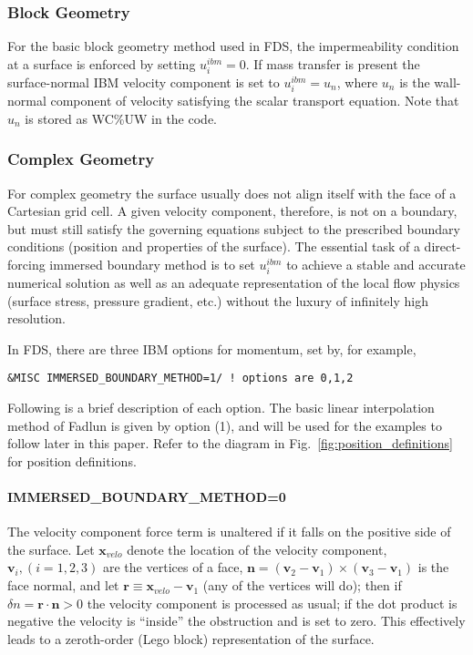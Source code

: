 \documentclass[12pt]{article}
\begin{document}
\subsubsection{Block Geometry}

For the basic block geometry method used in FDS, the impermeability condition at a surface is enforced by setting $u_i^{ibm} = 0$. If mass transfer is present the surface-normal IBM velocity component is set to $u_i^{ibm} = u_n$, where $u_n$ is the wall-normal component of velocity satisfying the scalar transport equation.  Note that $u_n$ is stored as {\ct WC\%UW} in the code.

\subsubsection{Complex Geometry}

For complex geometry the surface usually does not align itself with the face of a Cartesian grid cell. A given velocity component, therefore, is not on a boundary, but must still satisfy the governing equations subject to the prescribed boundary conditions (position and properties of the surface).  The essential task of a direct-forcing immersed boundary method is to set $u_i^{ibm}$ to achieve a stable and accurate numerical solution as well as an adequate representation of the local flow physics (surface stress, pressure gradient, etc.) without the luxury of infinitely high resolution.

In FDS, there are three IBM options for momentum, set by, for example,
\small
\begin{verbatim}
&MISC IMMERSED_BOUNDARY_METHOD=1/ ! options are 0,1,2
\end{verbatim}
\normalsize
Following is a brief description of each option. The basic linear interpolation method of Fadlun \cite{fadlun} is given by option (1), and will be used for the examples to follow later in this paper. Refer to the diagram in Fig.~\ref{fig:position_definitions} for position definitions.

\paragraph{\ct IMMERSED\_BOUNDARY\_METHOD=0}

The velocity component force term is unaltered if it falls on the positive side of the surface.  Let $\mathbf{x}_{velo}$ denote the location of the velocity component, $\mathbf{v}_i, (i=1,2,3)$ are the vertices of a face, $\mathbf{n} = (\mathbf{v}_2-\mathbf{v}_1) \times (\mathbf{v}_3-\mathbf{v}_1)$ is the face normal, and let $\mathbf{r} \equiv \mathbf{x}_{velo} - \mathbf{v}_1$ (any of the vertices will do); then if $\delta n =\mathbf{r} \cdot \mathbf{n} > 0$ the velocity component is processed as usual; if the dot product is negative the velocity is ``inside'' the obstruction and is set to zero.  This effectively leads to a zeroth-order (Lego block) representation of the surface.
\end{document}
